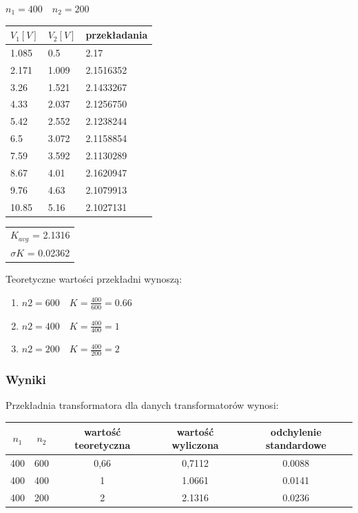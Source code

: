 \documentclass[a4paper, 11pt]{article}
\begin{document}
\begin{multicols}{3}
	\columnbreak
	$n_1 = 400 \quad n_2 = 200$
	\begin{tabular}{l|l|l}
		\hline
		$V_1 [V]$ & $V_2 [V]$ & przekładania \\ \hline
		1.085     & 0.5       & 2.17         \\ \hline
		2.171     & 1.009     & 2.1516352    \\ \hline
		3.26      & 1.521     & 2.1433267    \\ \hline
		4.33      & 2.037     & 2.1256750    \\ \hline
		5.42      & 2.552     & 2.1238244    \\ \hline
		6.5       & 3.072     & 2.1158854    \\ \hline
		7.59      & 3.592     & 2.1130289    \\ \hline
		8.67      & 4.01      & 2.1620947    \\ \hline
		9.76      & 4.63      & 2.1079913    \\ \hline
		10.85     & 5.16      & 2.1027131    \\ \hline
	\end{tabular}
	\begin{tabular}{c}
		$K_{avg}$ = 2.1316 \\
		$\sigma K$ = 0.02362
	\end{tabular}
\end{multicols}

Teoretyczne wartości przekładni wynoszą:
\begin{enumerate}
	\item $n2 = 600 \quad K = \frac{400}{600} = 0.66$
	\item $n2 = 400 \quad K = \frac{400}{400} = 1$
	\item $n2 = 200 \quad K = \frac{400}{200} = 2$
\end{enumerate}

\subsubsection{Wyniki}
\large
Przekładnia transformatora dla danych transformatorów wynosi: \\
\begin{tabular}{c|c|c|c|c}
	$n_1$ & $n_2$ & wartość teoretyczna & wartość wyliczona & odchylenie standardowe \\ \hline
	400   & 600   & 0,66                & 0,7112            & 0.0088                 \\
	400   & 400   & 1                   & 1.0661            & 0.0141                 \\
	400   & 200   & 2                   & 2.1316            & 0.0236                 \\
\end{tabular}
\end{document}
